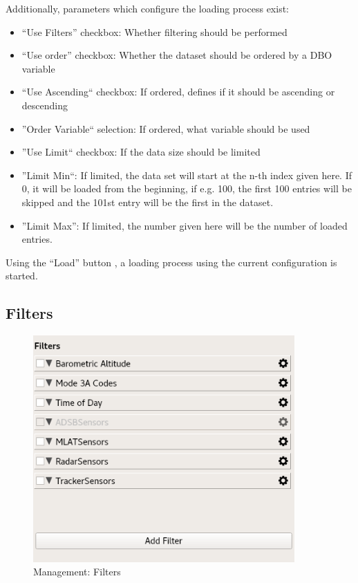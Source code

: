 \documentclass[10pt,letterpaper,extrafontsizes]{memoir}
\begin{document}
Additionally, parameters which configure the loading process exist:

\begin{itemize}
 \item ``Use Filters'' checkbox: Whether filtering should be performed
 \item ``Use order'' checkbox: Whether the dataset should be ordered by a DBO variable
 \item ``Use Ascending`` checkbox: If ordered, defines if it should be ascending or descending
 \item ''Order Variable`` selection: If ordered, what variable should be used
 \item ''Use Limit`` checkbox: If the data size should be limited
 \item ''Limit Min``: If limited, the data set will start at the n-th index given here. If 0, it will be loaded from the beginning, if e.g. 100, the first 100 entries will be skipped and the 101st entry will be the first in the dataset.
\item ''Limit Max'': If limited, the number given here will be the number of loaded entries.
\end{itemize}

Using the ``Load'' button , a loading process using the current configuration is started.

\subsection{Filters}

\begin{figure}[H]
  \center
    \includegraphics[width=10cm]{../screenshots/management_filters.png}
  \caption{Management: Filters}
  \label{fig:management_filters}
\end{figure}
\end{document}

